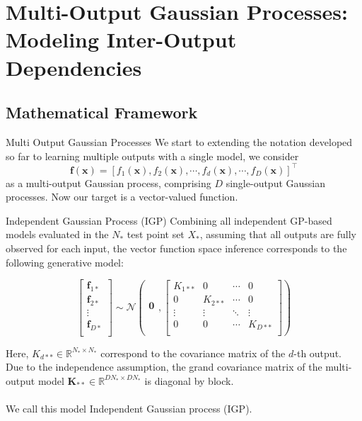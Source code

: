 \section{Multi-Output Gaussian Processes: Modeling Inter-Output Dependencies}

\subsection{Mathematical Framework}
\begin{frame}{Multi Output Gaussian Processes}
	We start to extending the notation developed so far to learning multiple outputs with a single model, we consider
	\begin{equation*}
		\boldsymbol{f}(\mathbf{x}) = \left[f_1(\mathbf{x}), f_2(\mathbf{x}), \cdots, f_d(\mathbf{x}), \cdots, f_D(\mathbf{x})\right]^\top
	\end{equation*}
	as a multi-output Gaussian process, comprising $D$ single-output Gaussian processes. Now our target is a vector-valued function.
\end{frame}

\begin{frame}{Independent Gaussian Process (IGP)}
	Combining all independent GP-based models evaluated in the $N_*$ test point set $X_*$, assuming that all outputs are fully observed for each input, the vector function space inference corresponds to the following generative model:
	
	
	\begin{equation*}\label{eq:igp}
		\left[ \begin{array}{c}
			\mathbf{f}_{1*}\\
			\mathbf{f}_{2*}\\
			\vdots\\
			\mathbf{f}_{D*}\\
		\end{array}
		\right]
		\sim
		\mathcal{N} \left(
		\begin{array}{c}
			\mathbf{0}\\
		\end{array},
		\left[ \begin{array}{cccccc}
			K_{1**} & 0 & \cdots & 0 \\
			0 & K_{2**} & \cdots & 0 \\
			\vdots & \vdots & \ddots & \vdots\\
			0 & 0 & \cdots & K_{D**}\\
		\end{array}
		\right] \right)
	\end{equation*}
	
	Here, $K_{d**} \in \mathbb{R}^{N_* \times N_*}$ correspond to the covariance matrix of the $d$-th output. Due to the independence assumption, the grand covariance matrix of the multi-output model $\mathbf{K}_{**} \in \mathbb{R}^{DN_* \times DN_*}$ is diagonal by block.\\~\\
	
	We call this model Independent Gaussian process (IGP).
\end{frame}


